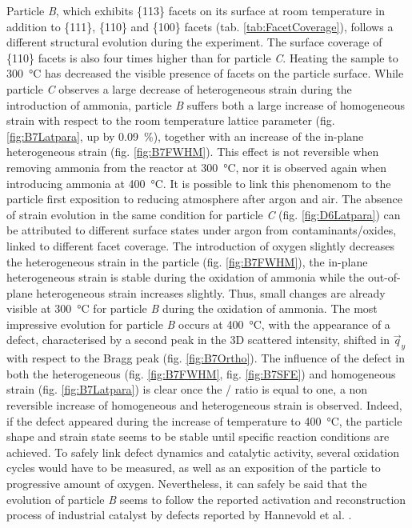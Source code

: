 Particle \textit{B}, which exhibits \{113\} facets on its surface at room temperature in addition to \{111\}, \{110\} and \{100\} facets (tab. \ref{tab:FacetCoverage}), follows a different structural evolution during the experiment.
The surface coverage of \{110\} facets is also four times higher than for particle \textit{C}.
Heating the sample to \qty{300}{\degreeCelsius} has decreased the visible presence of facets on the particle surface.
While particle \textit{C} observes a large decrease of heterogeneous strain during the introduction of ammonia, particle \textit{B} suffers both a large increase of homogeneous strain with respect to the room temperature lattice parameter (fig. \ref{fig:B7Latpara}, up by \qty{0.09}{\percent}), together with an increase of the in-plane heterogeneous strain (fig. \ref{fig:B7FWHM}).
This effect is not reversible when removing ammonia from the reactor at \qty{300}{\degreeCelsius}, nor it is observed again when introducing ammonia at \qty{400}{\degreeCelsius}.
It is possible to link this phenomenom to the particle first exposition to reducing atmosphere after argon and air.
The absence of strain evolution in the same condition for particle \textit{C} (fig. \ref{fig:D6Latpara}) can be attributed to different surface states under argon from contaminants/oxides, linked to different facet coverage.
The introduction of oxygen slightly decreases the heterogeneous strain in the particle (fig. \ref{fig:B7FWHM}), the in-plane heterogeneous strain is stable during the oxidation of ammonia while the out-of-plane heterogeneous strain increases slightly.
Thus, small changes are already visible at \qty{300}{\degreeCelsius} for particle \textit{B} during the oxidation of ammonia.
The most impressive evolution for particle \textit{B} occurs at \qty{400}{\degreeCelsius}, with the appearance of a defect, characterised by a second peak in the 3D scattered intensity, shifted in $\vec{q}_y$ with respect to the Bragg peak (fig. \ref{fig:B7Ortho}).
The influence of the defect in both the heterogeneous (fig. \ref{fig:B7FWHM}, fig. \ref{fig:B7SFE}) and homogeneous strain (fig. \ref{fig:B7Latpara}) is clear once the / ratio is equal to one, a non reversible increase of homogeneous and heterogeneous strain is observed.
Indeed, if the defect appeared during the increase of temperature to \qty{400}{\degreeCelsius}, the particle shape and strain state seems to be stable until specific reaction conditions are achieved.
To safely link defect dynamics and catalytic activity, several oxidation cycles would have to be measured, as well as an exposition of the particle to progressive amount of oxygen.
Nevertheless, it can safely be said that the evolution of particle \textit{B} seems to follow the reported activation and reconstruction process of industrial catalyst by defects reported by Hannevold et al. \parencite*{Hannevold2005}.

